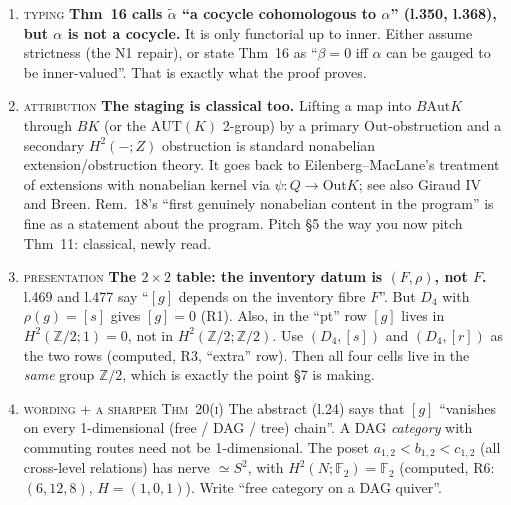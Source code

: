 \documentclass[11pt]{article}
\newcommand{\Z}{\mathbb{Z}}
\newcommand{\F}{\mathbb{F}}
\newcommand{\Inn}{\mathrm{Inn}}
\newcommand{\Out}{\mathrm{Out}}
\newcommand{\Aut}{\mathrm{Aut}}
\newcommand{\iss}[1]{\textsc{#1}}
\newcommand{\vd}[1]{\fbox{\textbf{#1}}}
\begin{document}
\begin{enumerate}[label=\textbf{N\arabic*},leftmargin=*]
The sharp statement, which is one line given Thm~11 with $C=B(\Inn K)$, $\rho=\mathrm{id}$:
\[
\exists\,(C,\rho):\ [g]\neq0\quad\iff\quad(\star)\ \text{does not split}\quad\iff\quad
[\star]\ne0\in H^2(\Inn K;Z).
\]
Here ``$\Leftarrow$'' uses the universal case and ``$\Rightarrow$'' uses $[g]=\rho^*[\star]$.
Non-split implies nonabelian with $Z\ne1$, but not conversely. Computed on 11 groups (R4,
columns ``split'' and ``nonab\&Z$\ne$1''). For the inventory reading: the $n$-lot ring
($K=D_n$, $n$ even) carries a class iff $4\mid n$ ($D_4$, $D_8$ yes; $D_6$ no). On the fixed
base $B(\Z/2)$ there is a sharper test: some involution of $\Inn K$ has no involution lift.

\item \vd{SHOULD} \iss{typing} \textbf{Thm~16 calls $\tilde\alpha$ ``a cocycle cohomologous to
$\alpha$'' (l.350, l.368), but $\alpha$ is not a cocycle.} It is only functorial up to inner.
Either assume strictness (the N1 repair), or state Thm~16 as ``$\beta=0$ iff $\alpha$ can be
gauged to be inner-valued''. That is exactly what the proof proves.

\item \vd{SHOULD} \iss{attribution} \textbf{The staging is classical too.} Lifting a map into
$B\Aut K$ through $BK$ (or the $\mathrm{AUT}(K)$ 2-group) by a primary $\Out$-obstruction and a
secondary $H^2(-;Z)$ obstruction is standard nonabelian extension/obstruction theory. It goes back
to Eilenberg--MacLane's treatment of extensions with nonabelian kernel via $\psi:Q\to\Out K$; see
also Giraud IV and Breen. Rem.~18's ``first genuinely nonabelian content in the program'' is fine
as a statement about the program. Pitch §5 the way you now pitch Thm~11: classical, newly read.

\item \vd{SHOULD} \iss{presentation} \textbf{The $2\times2$ table: the inventory datum is
$(F,\rho)$, not $F$.} l.469 and l.477 say ``$[g]$ depends on the inventory fibre $F$''. But
$D_4$ with $\rho(g)=[s]$ gives $[g]=0$ (R1). Also, in the ``pt'' row $[g]$ lives in
$H^2(\Z/2;1)=0$, not in $H^2(\Z/2;\Z/2)$. Use $(D_4,[s])$ and $(D_4,[r])$ as the two rows (computed,
R3, ``extra'' row). Then all four cells live in the \emph{same} group $\Z/2$, which is exactly the
point §7 is making.

\item \vd{SHOULD} \iss{wording + a sharper Thm~20(i)} The abstract (l.24) says that $[g]$ ``vanishes
on every 1-dimensional (free / DAG / tree) chain''. A DAG \emph{category} with commuting routes
need not be 1-dimensional. The poset $a_{1,2}<b_{1,2}<c_{1,2}$ (all cross-level relations) has
nerve $\simeq S^2$, with $H^2(N;\F_2)=\F_2$ (computed, R6: $(6,12,8)$, $H=(1,0,1)$). Write ``free
category on a DAG quiver''.


\end{enumerate}
\end{document}

